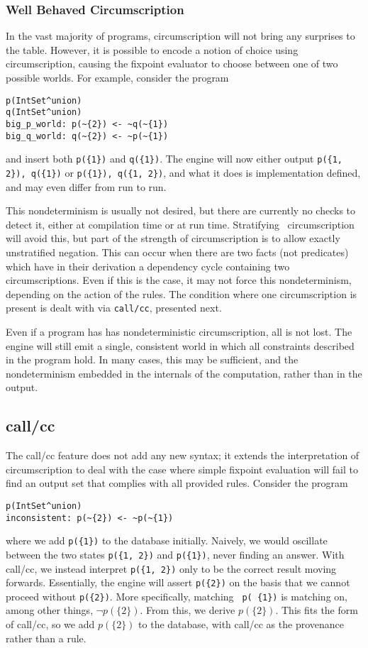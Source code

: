 \subsubsection{Well Behaved Circumscription}
In the vast majority of programs, circumscription will not bring any surprises to the table.
However, it is possible to encode a notion of choice using circumscription, causing the fixpoint evaluator to choose between one of two possible worlds.
For example, consider the program
\begin{verbatim}
p(IntSet^union)
q(IntSet^union)
big_p_world: p(~{2}) <- ~q(~{1})
big_q_world: q(~{2}) <- ~p(~{1})
\end{verbatim}
and insert both \texttt{p(\{1\})} and \texttt{q(\{1\})}.
The engine will now either output \texttt{p(\{1, 2\}), q(\{1\})} or \texttt{p(\{1\}), q(\{1, 2\})}, and what it does is implementation defined, and may even differ from run to run.

This nondeterminism is usually not desired, but there are currently no checks to detect it, either at compilation time or at run time.
Stratifying~\cite{prologbook} circumscription will avoid this, but part of the strength of circumscription is to allow exactly unstratified negation.
This can occur when there are two facts (not predicates) which have in their derivation a dependency cycle containing two circumscriptions.
Even if this is the case, it may not force this nondeterminism, depending on the action of the rules.
The condition where one circumscription is present is dealt with via \texttt{call/cc}, presented next.

Even if a program has has nondeterministic circumscription, all is not lost.
The engine will still emit a single, consistent world in which all constraints described in the program hold.
In many cases, this may be sufficient, and the nondeterminism embedded in the internals of the computation, rather than in the output.

\subsection{call/cc}
\label{holmes:sec:callcc}
The call/cc feature does not add any new syntax; it extends the interpretation of circumscription to deal with the case where simple fixpoint evaluation will fail to find an output set that complies with all provided rules.
Consider the program
\begin{verbatim}
p(IntSet^union)
inconsistent: p(~{2}) <- ~p(~{1})
\end{verbatim}
where we add \texttt{p(\{1\})} to the database initially.
Naively, we would oscillate between the two states \texttt{p(\{1, 2\})} and \texttt{p(\{1\})}, never finding an answer.
With call/cc, we instead interpret \texttt{p(\{1, 2\})} only to be the correct result moving forwards.
Essentially, the engine will assert \texttt{p(\{2\})} on the basis that we cannot proceed without \texttt{p(\{2\})}.
More specifically, matching \texttt{~p(~\{1\})} is matching on, among other things, $\neg p(\{2\})$.
From this, we derive $p(\{2\})$.
This fits the form of call/cc, so we add $p(\{2\})$ to the database, with call/cc as the provenance rather than a rule.

